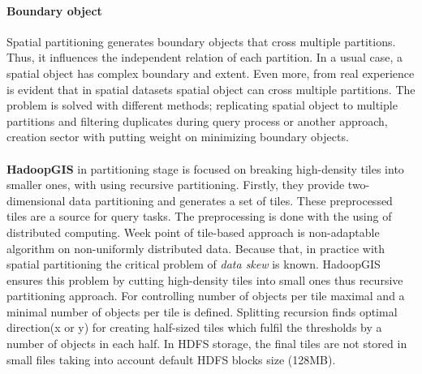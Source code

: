 \documentclass[a4paper,12pt,oneside]{report}
\begin{document}
\paragraph{Boundary object}
Spatial partitioning generates boundary objects that cross multiple partitions. Thus, it influences the independent relation 
of each partition. In a usual case, a spatial object has complex boundary and extent. Even more, 
from real experience is evident that in spatial datasets spatial object can cross multiple partitions. The problem is solved with 
different methods; replicating spatial object to multiple partitions and filtering duplicates during query process 
or another approach, creation sector with putting weight on minimizing boundary objects. 

\paragraph*{} \textbf{HadoopGIS} in partitioning stage is focused on breaking high-density tiles into smaller ones, with using 
recursive partitioning. Firstly, they provide two-dimensional data partitioning and generates a set of tiles.
These preprocessed tiles are a source for query tasks. The preprocessing is done with the using of distributed computing.
 Week point of tile-based approach is non-adaptable algorithm on non-uniformly distributed data. Because that, 
 in practice with spatial partitioning the critical problem of \textit{data skew} is known. HadoopGIS ensures 
 this problem by cutting high-density tiles into small ones thus recursive partitioning approach. For controlling 
 number of objects per tile  maximal and a minimal number of objects per tile is defined. Splitting recursion 
 finds optimal direction(x or y) for creating half-sized tiles which fulfil the thresholds by a number of objects 
 in each half. In HDFS storage, the final tiles are not stored in small files taking into account default HDFS blocks size (128MB). 
\end{document}
